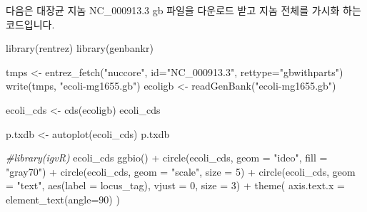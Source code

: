 \documentclass[
]{book}
\newenvironment{Shaded}{\begin{snugshade}}{\end{snugshade}}
\newcommand{\AttributeTok}[1]{\textcolor[rgb]{0.77,0.63,0.00}{#1}}
\newcommand{\CommentTok}[1]{\textcolor[rgb]{0.56,0.35,0.01}{\textit{#1}}}
\newcommand{\DecValTok}[1]{\textcolor[rgb]{0.00,0.00,0.81}{#1}}
\newcommand{\FunctionTok}[1]{\textcolor[rgb]{0.00,0.00,0.00}{#1}}
\newcommand{\NormalTok}[1]{#1}
\newcommand{\OtherTok}[1]{\textcolor[rgb]{0.56,0.35,0.01}{#1}}
\newcommand{\SpecialCharTok}[1]{\textcolor[rgb]{0.00,0.00,0.00}{#1}}
\newcommand{\StringTok}[1]{\textcolor[rgb]{0.31,0.60,0.02}{#1}}
\begin{document}
다음은 대장균 지놈 NC\_000913.3 gb 파일을 다운로드 받고 지놈 전체를 가시화 하는 코드입니다.

\begin{Shaded}
\begin{Highlighting}[]
\FunctionTok{library}\NormalTok{(rentrez)}
\FunctionTok{library}\NormalTok{(genbankr)}

\NormalTok{tmps }\OtherTok{\textless{}{-}} \FunctionTok{entrez\_fetch}\NormalTok{(}\StringTok{"nuccore"}\NormalTok{, }\AttributeTok{id=}\StringTok{"NC\_000913.3"}\NormalTok{, }\AttributeTok{rettype=}\StringTok{"gbwithparts"}\NormalTok{)}
\FunctionTok{write}\NormalTok{(tmps, }\StringTok{"ecoli{-}mg1655.gb"}\NormalTok{)}
\NormalTok{ecoligb }\OtherTok{\textless{}{-}} \FunctionTok{readGenBank}\NormalTok{(}\StringTok{"ecoli{-}mg1655.gb"}\NormalTok{)}

\NormalTok{ecoli\_cds }\OtherTok{\textless{}{-}} \FunctionTok{cds}\NormalTok{(ecoligb)}
\NormalTok{ecoli\_cds}

\NormalTok{p.txdb }\OtherTok{\textless{}{-}} \FunctionTok{autoplot}\NormalTok{(ecoli\_cds)}
\NormalTok{p.txdb}

\CommentTok{\#library(igvR)}
\NormalTok{ecoli\_cds}
\FunctionTok{ggbio}\NormalTok{() }\SpecialCharTok{+} 
  \FunctionTok{circle}\NormalTok{(ecoli\_cds, }\AttributeTok{geom =} \StringTok{"ideo"}\NormalTok{, }\AttributeTok{fill =} \StringTok{"gray70"}\NormalTok{) }\SpecialCharTok{+}
  \FunctionTok{circle}\NormalTok{(ecoli\_cds, }\AttributeTok{geom =} \StringTok{"scale"}\NormalTok{, }\AttributeTok{size =} \DecValTok{5}\NormalTok{) }\SpecialCharTok{+}
  \FunctionTok{circle}\NormalTok{(ecoli\_cds, }\AttributeTok{geom =} \StringTok{"text"}\NormalTok{, }\FunctionTok{aes}\NormalTok{(}\AttributeTok{label =}\NormalTok{ locus\_tag), }\AttributeTok{vjust =} \DecValTok{0}\NormalTok{, }\AttributeTok{size =} \DecValTok{3}\NormalTok{) }\SpecialCharTok{+}
  \FunctionTok{theme}\NormalTok{(}
    \AttributeTok{axis.text.x =} \FunctionTok{element\_text}\NormalTok{(}\AttributeTok{angle=}\DecValTok{90}\NormalTok{)}
\NormalTok{  )}


\end{Highlighting}
\end{Shaded}
\end{document}
